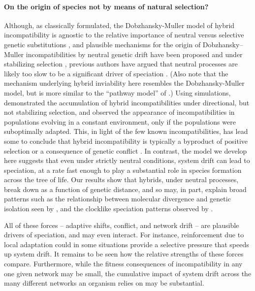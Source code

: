\documentclass{article}
\newcommand{\1}{\mathbbm{1}}
\begin{document}
\paragraph{On the origin of species not by means of natural selection?}
Although, as classically formulated, 
the Dobzhansky-Muller model of hybrid incompatibility is agnostic to the relative importance of neutral versus selective genetic substitutions \citep{coyne1998evolutionary},
and plausible mechanisms for the origin of Dobzhansky--Muller incompatibilities by neutral genetic drift have been proposed \citep{lynch2000origin} 
and under stabilizing selection \citep{fierst},
previous authors have argued that neutral processes are likely too slow to be a significant driver of speciation \citep{nei1983models,seehausen2014genomics}.
(Also note that the mechanism underlying hybrid inviability here 
resembles the Dobzhansky-Muller model,
but is more similar to the ``pathway model'' of \citet{lindtke2015genetic}.)
Using simulations, \citet{porter2002speciation} demonstrated the accumulation of hybrid incompatibilities under directional, but not stabilizing selection, and \citet{palmer2009dynamics} observed the appearance of incompatibilities in populations evolving in a constant environment, only if the populations were suboptimally adapted.
This, in light of the few known incompatibilities, has lead some to conclude that hybrid incompatibility is typically a byproduct of positive selection \citep{orr2004speciation, schluter2009evidence} 
or a consequence of genetic conflict \citep{presgraves2010molecular, crespi2013conflictual}.
In contrast, the model we develop here suggests that even under strictly neutral conditions, 
system drift can lead to speciation, at a rate fast enough 
to play a substantial role in species formation across the tree of life. 
Our results show that hybrids, under neutral processes, break down as a function of genetic distance,
and so may, in part, explain broad patterns
such as the relationship between molecular divergence and genetic isolation 
seen by \citet{roux2016shedding}, 
and the clocklike speciation patterns observed by \citet{hedges2015tree}.

All of these forces -- adaptive shifts, conflict, and network drift --
are plausible drivers of speciation, and may even interact.
For instance, reinforcement due to local adaptation could in some situations provide a selective pressure
that speeds up system drift.
It remains to be seen how the relative strengths of these forces compare.
Furthermore,
while the fitness consequences of incompatibility in any one given network may be small, 
the cumulative impact of system drift across the many different networks an organism relies on may be substantial. 
\end{document}
